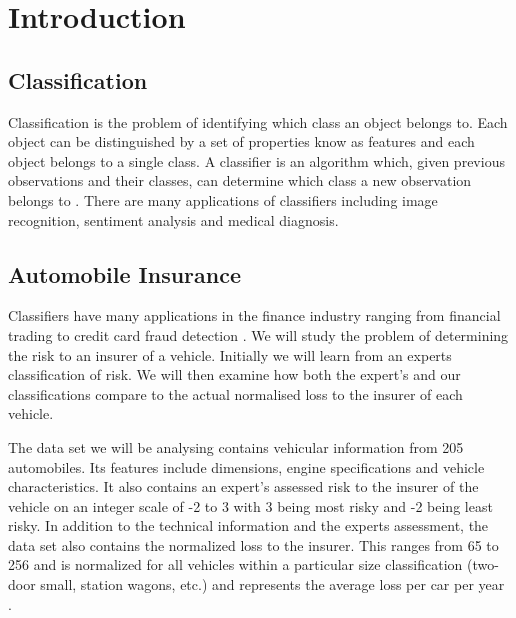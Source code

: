 \chapter{Introduction}

\section{Classification}

Classification is the problem of identifying which class an object belongs to.
Each object can be distinguished by a set of properties know as features and each object belongs to a single class.
A classifier is an algorithm which, given previous observations and their classes, can determine which class a new observation belongs to \cite{Theodoridis03}.
There are many applications of classifiers including image recognition, sentiment analysis and medical diagnosis.

\section{Automobile Insurance}

Classifiers have many applications in the finance industry ranging from financial trading \cite{Gerlein16} to credit card fraud detection \cite{Pozzolo15}.
We will study the problem of determining the risk to an insurer of a vehicle.
Initially we will learn from an experts classification of risk.
We will then examine how both the expert's and our classifications compare to the actual normalised loss to the insurer of each vehicle.

The data set we will be analysing contains vehicular information from 205 automobiles.
Its features include dimensions, engine specifications and vehicle characteristics.
It also contains an expert's assessed risk to the insurer of the vehicle on an integer scale of -2 to 3 with 3 being most risky and -2 being least risky.
In addition to the technical information and the experts assessment, the data set also contains the normalized loss to the insurer.
This ranges from 65 to 256 and is normalized for all vehicles within a particular size classification (two-door small, station wagons, etc.) and represents the average loss per car per year \cite{Automobile}.